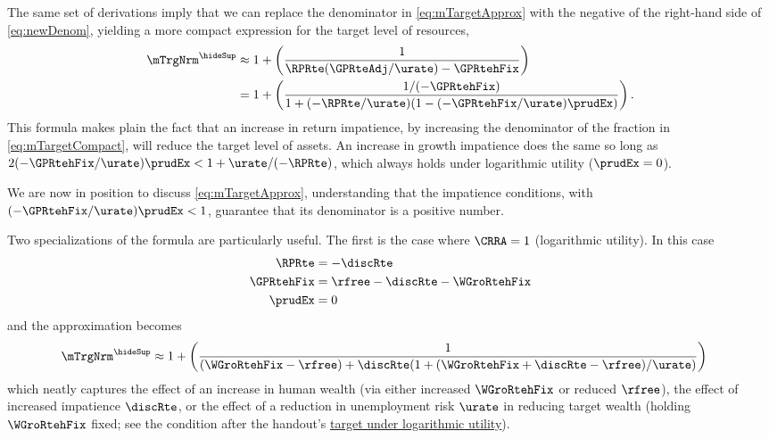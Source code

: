 \documentclass{econark}
\begin{document}
The same set of derivations imply that we can
replace the denominator in \eqref{eq:mTargetApprox} with the negative
of the right-hand side of \eqref{eq:newDenom}, yielding a more compact expression
for the target level of resources,
\begin{equation}\begin{gathered}\begin{aligned}
 \mTrgNrm^{\hideSup} & \approx  1 + \left(\frac{1}{\RPRte(\GPRteAdj/\urate) - \GPRtehFix }\right)
\\ & =  1 + \left(\frac{1/(-\GPRtehFix)}{1+(-\RPRte/\urate)(1-(-\GPRtehFix/\urate)\prudEx)  }\right) \label{eq:mTargetCompact}
.
\end{aligned}\end{gathered}\end{equation}
This formula makes plain the fact that an
increase in return impatience, by increasing the denominator of the 
fraction in 
\eqref{eq:mTargetCompact}, will reduce the target level of assets.  An increase in growth impatience does the same so long as $2(-\GPRtehFix/\urate)\prudEx < 1+\urate/(-\RPRte)$, which always holds under logarithmic utility ($\prudEx=0$).

We are now in position to discuss \eqref{eq:mTargetApprox}, understanding that the
impatience conditions, with $(-\GPRtehFix/\urate)\prudEx < 1$, guarantee that its denominator is a positive number.

Two specializations of the formula are particularly useful.  The first is
the case where $\CRRA = 1$ (logarithmic utility).  In this case
\begin{equation}\begin{gathered}\begin{aligned}
    \RPRte & =  -\discRte
\\  \GPRtehFix & =  \rfree-\discRte-\WGroRtehFix
\\  \prudEx & =  0
\end{aligned}\end{gathered}\end{equation}
and the approximation becomes
\begin{equation}\begin{gathered}\begin{aligned}
 \mTrgNrm^{\hideSup} & \approx  1 + \left(\frac{1}{(\WGroRtehFix-\rfree)+\discRte(1+(\WGroRtehFix+\discRte-\rfree)/\urate)}\right)
\end{aligned}\end{gathered}\end{equation}
which neatly captures the effect of an increase in human wealth (via either increased $\WGroRtehFix$ or reduced $\rfree$), the effect of increased impatience $\discRte$,
or the effect of a reduction in unemployment risk $\urate$ in reducing target wealth (holding $\WGroRtehFix$ fixed; see the condition after the handout's \hyperref[eq:mTargetLogCase]{target under logarithmic utility}).
\end{document}
